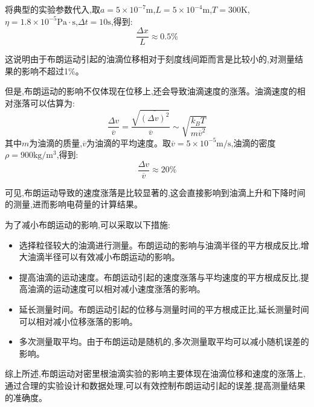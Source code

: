 \documentclass[UTF8]{ctexart}
\begin{document}
\begin{enumerate}
    将典型的实验参数代入,取$a=5\times 10^{-7}\mathrm{m}$,$L=5\times 10^{-4}\mathrm{m}$,$T=300\mathrm{K}$,$\eta=1.8\times 10^{-5}\mathrm{Pa\cdot s}$,$\Delta t=10\mathrm{s}$,得到:
    \begin{equation}
      \frac{\Delta x}{L} \approx 0.5\%
    \end{equation}
    
    这说明由于布朗运动引起的油滴位移相对于刻度线间距而言是比较小的,对测量结果的影响不超过1\%。
    
    但是,布朗运动的影响不仅体现在位移上,还会导致油滴速度的涨落。油滴速度的相对涨落可以估算为:
    \begin{equation}
      \frac{\Delta v}{\overline{v}} = \frac{\sqrt{\overline{(\Delta v)^2}}}{\overline{v}} \sim \sqrt{\frac{k_B T}{m \overline{v}^2}}
    \end{equation}
    其中$m$为油滴的质量,$\overline{v}$为油滴的平均速度。取$\overline{v}=5\times 10^{-5}\mathrm{m/s}$,油滴的密度$\rho=900\mathrm{kg/m^3}$,得到:
    \begin{equation}
      \frac{\Delta v}{\overline{v}} \approx 20\%  
    \end{equation}
  
    可见,布朗运动导致的速度涨落是比较显著的,这会直接影响到油滴上升和下降时间的测量,进而影响电荷量的计算结果。
    
    为了减小布朗运动的影响,可以采取以下措施:
    \begin{itemize}
      \item 选择粒径较大的油滴进行测量。布朗运动的影响与油滴半径的平方根成反比,增大油滴半径可以有效减小布朗运动的影响。
      \item 提高油滴的运动速度。布朗运动引起的速度涨落与平均速度的平方根成反比,提高油滴的运动速度可以相对减小速度涨落的影响。
      \item 延长测量时间。布朗运动引起的位移与测量时间的平方根成正比,延长测量时间可以相对减小位移涨落的影响。
      \item 多次测量取平均。由于布朗运动是随机的,多次测量取平均可以减小随机误差的影响。
    \end{itemize}
    
    综上所述,布朗运动对密里根油滴实验的影响主要体现在油滴位移和速度的涨落上,通过合理的实验设计和数据处理,可以有效控制布朗运动引起的误差,提高测量结果的准确度。
  \end{enumerate}
\end{document}
